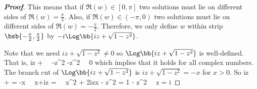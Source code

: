 \begin{proof}[\bf Proof]
%
%
%
%
%

This means that if $\Re(w)\in [0,\pi]$ two solutions must lie on different sides of $\Re(w) = \frac{\pi}2$. Also, if $\Re(w)\in (-\pi,0)$ two solutions must lie on different sides of $\Re(w) = -\frac{\pi}2$. Therefore, we only define $w$ within strip $\bsb{-\frac{\pi}2,\frac{\pi}2}$ by $-i\Log\bb{iz + \sqrt{1-z^2}}$.

Note that we need $iz + \sqrt{1-z^2}\neq 0$ so $\Log\bb{iz + \sqrt{1-z^2}}$ is well-defined. That is,
\be
iz +   \ \ra\ -z^2 -z^2 \ \ra\ 0 
\ee
which implies that it holds for all complex numbers. The branch cut of $\Log\bb{iz + \sqrt{1-z^2}}$ is $iz + \sqrt{1-z^2} = -x$ for $x>0$. So
\be
iz +  = -x \ \ra\ x+iz =  \ \ra\ x^2 + 2izx - z^2 = 1 - z^2 \ \ra\ z = i
\ee


\end{proof}
